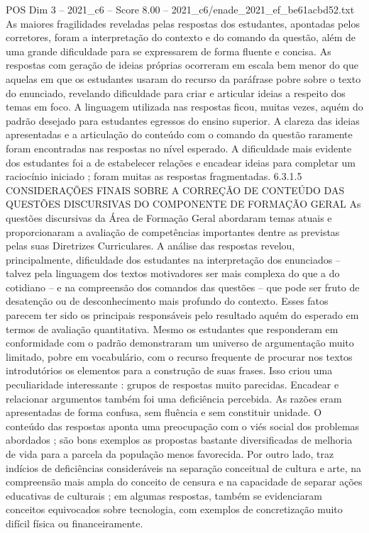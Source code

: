 \begin{textsample}{POS Dim 3 – 2021\_c6 – Score 8.00 – 2021\_c6/enade\_2021\_ef\_be61acbd52.txt}
As maiores fragilidades reveladas pelas respostas dos estudantes, apontadas pelos corretores, foram a interpretação do contexto e do comando da questão, além de uma grande dificuldade para se expressarem de forma fluente e concisa.
As respostas com geração de ideias próprias ocorreram em escala bem menor do que aquelas em que os estudantes usaram do recurso da paráfrase pobre sobre o texto do enunciado, revelando dificuldade para criar e articular ideias a respeito dos temas em foco.
A linguagem utilizada nas respostas ficou, muitas vezes, aquém do padrão desejado para estudantes egressos do ensino superior.
A clareza das ideias apresentadas e a articulação do conteúdo com o comando da questão raramente foram encontradas nas respostas no nível esperado.
A dificuldade mais evidente dos estudantes foi a de estabelecer relações e encadear ideias para completar um raciocínio iniciado ; foram muitas as respostas fragmentadas. 6.3.1.5 CONSIDERAÇÕES FINAIS SOBRE A CORREÇÃO DE CONTEÚDO DAS QUESTÕES DISCURSIVAS DO COMPONENTE DE FORMAÇÃO GERAL As questões discursivas da Área de Formação Geral abordaram temas atuais e proporcionaram a avaliação de competências importantes dentre as previstas pelas suas Diretrizes Curriculares.
A análise das respostas revelou, principalmente, dificuldade dos estudantes na interpretação dos enunciados – talvez pela linguagem dos textos motivadores ser mais complexa do que a do cotidiano – e na compreensão dos comandos das questões – que pode ser fruto de desatenção ou de desconhecimento mais profundo do contexto.
Esses fatos parecem ter sido os principais responsáveis pelo resultado aquém do esperado em termos de avaliação quantitativa.
Mesmo os estudantes que responderam em conformidade com o padrão demonstraram um universo de argumentação muito limitado, pobre em vocabulário, com o recurso frequente de procurar nos textos introdutórios os elementos para a construção de suas frases.
Isso criou uma peculiaridade interessante : grupos de respostas muito parecidas.
Encadear e relacionar argumentos também foi uma deficiência percebida.
As razões eram apresentadas de forma confusa, sem fluência e sem constituir unidade.
O conteúdo das respostas aponta uma preocupação com o viés social dos problemas abordados ; são bons exemplos as propostas bastante diversificadas de melhoria de vida para a parcela da população menos favorecida.
Por outro lado, traz indícios de deficiências consideráveis na separação conceitual de cultura e arte, na compreensão mais ampla do conceito de censura e na capacidade de separar ações educativas de culturais ; em algumas respostas, também se evidenciaram conceitos equivocados sobre tecnologia, com exemplos de concretização muito difícil física ou financeiramente.

\end{textsample}

